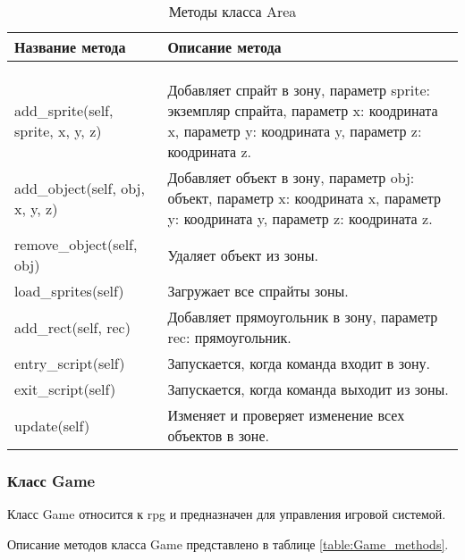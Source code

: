 \begin{xltabular}{\textwidth}{|X|X|}
	\caption{Методы класса Area}\label{table:Area_methods} \\
	\hline \centrow
	Название метода & \centrow  Описание метода \\
	\hline {} &  \\ \hline
	\endfirsthead
	\\
	\hline {} &  \\ \hline
	\finishhead
	add\_sprite(self, sprite, x, y, z) & Добавляет спрайт в зону, параметр sprite: экземпляр спрайта, параметр x: коодрината x, параметр y: коодрината y, параметр z: коодрината z. \\
	\hline
	add\_object(self, obj, x, y, z) & Добавляет объект в зону, параметр obj: объект, параметр x: коодрината x, параметр y: коодрината y, параметр z: коодрината z. \\
	\hline
	remove\_object(self, obj) & Удаляет объект из зоны. \\
	\hline
	load\_sprites(self) & Загружает все спрайты зоны. \\
	\hline
	add\_rect(self, rec) &  Добавляет прямоугольник в зону, параметр rec: прямоугольник. \\
	\hline
	entry\_script(self) & Запускается, когда команда входит в зону. \\
	\hline
	exit\_script(self) & Запускается, когда команда выходит из зоны. \\
	\hline
	update(self) & Изменяет и проверяет изменение всех объектов в зоне. \\
	\hline
\end{xltabular}

\subsubsection{Класс Game}

Класс Game относится к rpg и предназначен для управления игровой системой.

Описание методов класса Game представлено в таблице \ref{table:Game_methods}.


